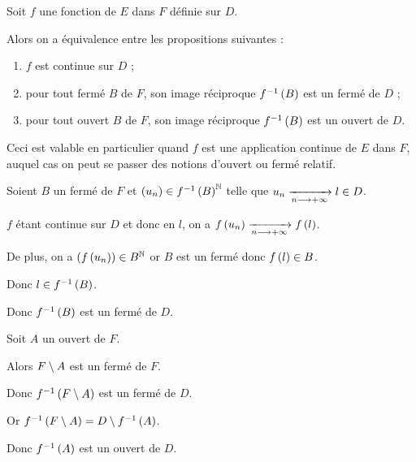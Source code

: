 \begin{theo}
Soit \(f\) une fonction de \(E\) dans \(F\) définie sur \(D\).

Alors on a équivalence entre les propositions suivantes :

\begin{enumerate}
    \item \(f\) est continue sur \(D\) ; \\
    \item pour tout fermé \(B\) de \(F\), son image réciproque \(f^{-1}\left(B\right)\) est un fermé de \(D\) ; \\
    \item pour tout ouvert \(B\) de \(F\), son image réciproque \(f^{-1}\left(B\right)\) est un ouvert de \(D\).
\end{enumerate}

Ceci est valable en particulier quand \(f\) est une application continue de \(E\) dans \(F\), auquel cas on peut se passer des notions d'ouvert ou fermé relatif.
\end{theo}

\begin{dem}
Soient \(B\) un fermé de \(F\) et \(\left(u_n\right)\in f^{-1}\left(B\right)^{\mathbb{N}}\) telle que \(u_n\xrightarrow[n\longrightarrow+\infty]{}l\in D\).

\(f\) étant continue sur \(D\) et donc en \(l\), on a \(f\left(u_n\right)\xrightarrow[n\longrightarrow+\infty]{}f\left(l\right)\).

De plus, on a \(\left(f\left(u_n\right)\right)\in B^{\mathbb{N}}\) or \(B\) est un fermé donc \(f\left(l\right)\in B\).

Donc \(l\in f^{-1}\left(B\right)\).

Donc \(f^{-1}\left(B\right)\) est un fermé de \(D\).
\end{dem}

\begin{dem}
Soit \(A\) un ouvert de \(F\).

Alors \(F\setminus A\) est un fermé de \(F\).

Donc \(f^{-1}\left(F\setminus A\right)\) est un fermé de \(D\).

Or \(f^{-1}\left(F\setminus A\right)=D\setminus f^{-1}\left(A\right)\).

Donc \(f^{-1}\left(A\right)\) est un ouvert de \(D\).
\end{dem}

